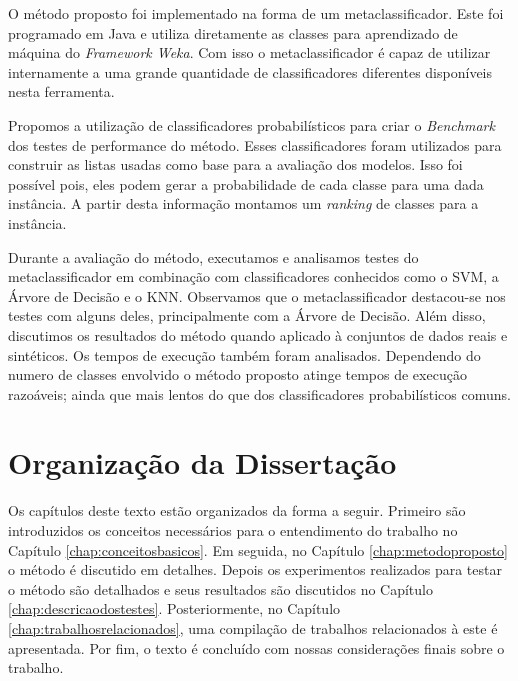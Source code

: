 O método proposto foi implementado na forma de um metaclassificador.
Este foi programado em Java e utiliza diretamente as classes para aprendizado de máquina do \textit{Framework Weka}.
Com isso o metaclassificador é capaz de utilizar internamente a uma grande quantidade de classificadores diferentes disponíveis nesta ferramenta.

Propomos a utilização de classificadores probabilísticos para criar o \textit{Benchmark} dos testes de performance do método. 
Esses classificadores foram utilizados para construir as listas usadas como base para a avaliação dos modelos.
Isso foi possível pois, eles podem gerar a probabilidade de cada classe para uma dada instância.
A partir desta informação montamos um \textit{ranking} de classes para a instância.

Durante a avaliação do método, executamos e analisamos testes do metaclassificador em combinação com classificadores conhecidos como o SVM, a Árvore de Decisão e o KNN.
Observamos que o metaclassificador destacou-se nos testes com alguns deles, principalmente com a Árvore de Decisão.
Além disso, discutimos os resultados do método quando aplicado à conjuntos de dados reais e sintéticos.
Os tempos de execução também foram analisados.
Dependendo do numero de classes envolvido o método proposto atinge tempos de execução razoáveis; ainda que mais lentos do que dos classificadores probabilísticos comuns.

\section{Organização da Dissertação}

Os capítulos deste texto estão organizados da forma a seguir.
Primeiro são introduzidos os conceitos necessários para o entendimento do trabalho no Capítulo \ref{chap:conceitosbasicos}.
Em seguida, no Capítulo \ref{chap:metodoproposto} o método é discutido em detalhes.
Depois os experimentos realizados para testar o método são detalhados e seus resultados são discutidos no Capítulo \ref{chap:descricaodostestes}.
Posteriormente, no Capítulo \ref{chap:trabalhosrelacionados}, uma compilação de trabalhos relacionados à este é apresentada.
Por fim, o texto é concluído com nossas considerações finais sobre o trabalho.
